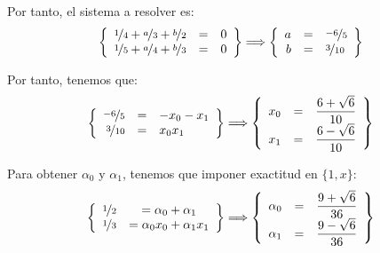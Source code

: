 \documentclass[12pt]{article}
\begin{document}
{\begin{ejercicio}
\begin{enumerate}
            Por tanto, el sistema a resolver es:
            \begin{equation*}
                \left\{
                \begin{array}{rcl}
                    \nicefrac{1}{4} + \nicefrac{a}{3} + \nicefrac{b}{2} &=& 0\\
                    \nicefrac{1}{5} + \nicefrac{a}{4} + \nicefrac{b}{3} &=& 0
                \end{array}
                \right\}\Longrightarrow
                \left\{
                    \begin{array}{rcl}
                        a&=&\nicefrac{-6}{5}\\
                        b&=&\nicefrac{3}{10}
                    \end{array}
                \right\}
            \end{equation*}

            Por tanto, tenemos que:
            \begin{equation*}
                \left\{
                    \begin{array}{rcl}
                        \nicefrac{-6}{5} &=& -x_0-x_1\\
                        \nicefrac{3}{10} &=& x_0x_1
                    \end{array}
                \right\}\Longrightarrow
                \left\{
                    \begin{array}{rcl}
                        x_0 &=& \dfrac{6+\sqrt{6}}{10}\\
                        x_1 &=& \dfrac{6-\sqrt{6}}{10}
                    \end{array}
                \right\}
            \end{equation*}

            Para obtener $\alpha_0$ y $\alpha_1$, tenemos que imponer exactitud en $\{1,x\}$:
            \begin{equation*}
                \left\{
                    \begin{array}{rcl}
                        \nicefrac{1}{2} &= \alpha_0 + \alpha_1\\
                        \nicefrac{1}{3} &= \alpha_0 x_0 + \alpha_1 x_1
                    \end{array}
                \right\}
                \Longrightarrow
                \left\{
                    \begin{array}{rcl}
                        \alpha_0 &=& \dfrac{9+\sqrt{6}}{36}\\
                        \alpha_1 &=& \dfrac{9-\sqrt{6}}{36}
                    \end{array}
                \right\}
            \end{equation*}



\end{enumerate}
\end{ejercicio}}
\end{document}
